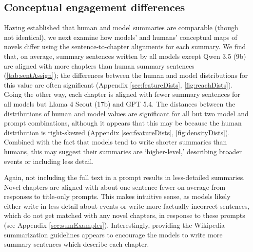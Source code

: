 \documentclass{article} %
\begin{document}
\subsection{Conceptual engagement differences}
Having established that human and model summaries are comparable (though not identical), we next examine how models' and humans' conceptual maps of novels differ using the sentence-to-chapter alignments for each summary.
We find that, on average, summary sentences written by all models except Qwen 3.5 (9b) are aligned with more chapters than human summary sentences (\cref{tab:sentAssign}); the differences between the human and model distributions for this value are often significant (Appendix \ref{sec:featureDists}, \cref{fig:reachDists}).
Going the other way, each chapter is aligned with fewer summary sentences for all models but Llama 4 Scout (17b) and GPT 5.4.
The distances between the distributions of human and model values are significant for all but two model and prompt combinations, although it appears that this may be because the human distribution is right-skewed (Appendix \ref{sec:featureDists}, \cref{fig:densityDists}).
Combined with the fact that models tend to write shorter summaries than humans, this may suggest their summaries are `higher-level,' describing broader events or including less detail.

Again, not including the full text in a prompt results in less-detailed summaries. Novel chapters are aligned with about one sentence fewer on average from responses to title-only prompts. This makes intuitive sense, as models likely either write in less detail about events or write more factually incorrect sentences, which do not get matched with any novel chapters, in response to these prompts (see Appendix \ref{sec:sumExamples}). Interestingly, providing the Wikipedia summarization guidelines appears to encourage the models to write more summary sentences which describe each chapter.
\end{document}
